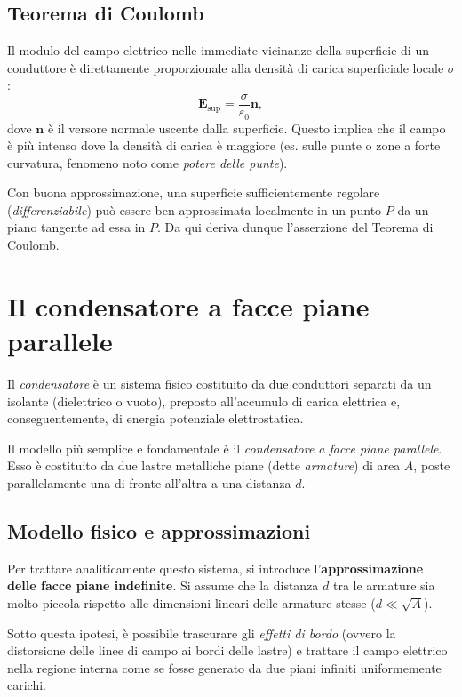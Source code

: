 \documentclass[a4paper,11pt]{report}
\begin{document}
\subsection{Teorema di Coulomb}
Il modulo del campo elettrico nelle immediate vicinanze della superficie di un conduttore è direttamente proporzionale alla densità di carica superficiale locale $\sigma$:
\begin{equation}
    \bm{E}_{\text{sup}} = \frac{\sigma}{\varepsilon_0} \bm{n},
\end{equation}
dove $\bm{n}$ è il versore normale uscente dalla superficie. Questo implica che il campo è più intenso dove la densità di carica è maggiore (es. sulle punte o zone a forte curvatura, fenomeno noto come \textit{potere delle punte}).

Con buona approssimazione, una superficie sufficientemente regolare (\textit{differenziabile}) può essere ben approssimata localmente in un punto $P$ da un piano tangente ad essa in $P$. Da qui deriva dunque l'asserzione del Teorema di Coulomb. 


\section{Il condensatore a facce piane parallele}

Il \textit{condensatore} è un sistema fisico costituito da due conduttori separati da un isolante (dielettrico o vuoto), preposto all'accumulo di carica elettrica e, conseguentemente, di energia potenziale elettrostatica.

Il modello più semplice e fondamentale è il \textit{condensatore a facce piane parallele}.
Esso è costituito da due lastre metalliche piane (dette \textit{armature}) di area $A$, poste parallelamente una di fronte all'altra a una distanza $d$.

\subsection{Modello fisico e approssimazioni}
Per trattare analiticamente questo sistema, si introduce l'\textbf{approssimazione delle facce piane indefinite}.
Si assume che la distanza $d$ tra le armature sia molto piccola rispetto alle dimensioni lineari delle armature stesse ($d \ll \sqrt{A}$).

Sotto questa ipotesi, è possibile trascurare gli \textit{effetti di bordo} (ovvero la distorsione delle linee di campo ai bordi delle lastre) e trattare il campo elettrico nella regione interna come se fosse generato da due piani infiniti uniformemente carichi.
\end{document}

